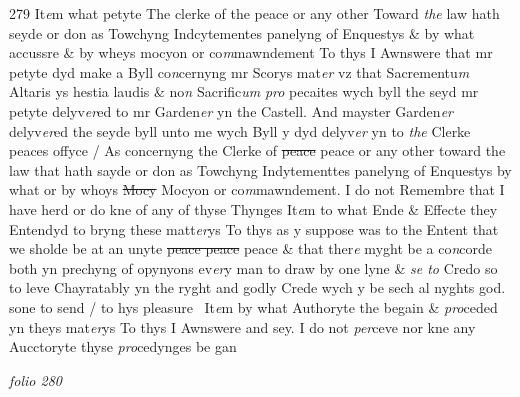 \documentclass[12pt, a4paper]{book}
\begin{document}
{\color{Mahogany}279} 
				\marginpar[\vspace{0.5cm}{\textcolor{Gray}{10}}]{}
			 It\textit{e}m what petyte The clerke of the peace or any other Toward \textit{the} law hath seyde or don as Towchyng Indcytementes panelyng of Enquestys \& by what accussre \& by wheys mocyon or co\textit{m}mawndement To thys I Awnswere that mr petyte dyd make a Byll co\textit{n}cernyng mr Scorys mat\textit{er} vz that Sacrementu\textit{m} Altaris ys hestia laudis \& no\textit{n} Sacrific\textit{um}
               \textit{pro} pecaites wych byll the seyd mr petyte delyv\textit{er}ed to mr Garden\textit{er} yn the Castell. And mayster Garden\textit{er} delyv\textit{er}ed the seyde byll unto me wych Byll y dyd delyv\textit{er} yn to \textit{the} Clerke peaces offyce / As concernyng the Clerke of \sout{peace} peace or any other toward the law that hath sayde or don as Towchyng  Indytementtes panelyng of Enquestys by what or by whoys \sout{Mocy} Mocyon or co\textit{m}mawndement. I do not Remembre that I have herd or do kne of any of thyse Thynges 
				\marginpar[\vspace{0.5cm}{\textcolor{Gray}{11}}]{}
			 It\textit{e}m to what Ende \& Effecte they Entendyd to bryng these matt\textit{er}ys To thys as y suppose was to the Entent that we sholde be at an unyte \sout{peace peace} peace \& that ther\textit{e} myght be a co\textit{n}corde both yn prechyng of opynyons ev\textit{er}y man to draw by one lyne \& \textit{se to} Credo so to leve Chayratably yn the ryght and godly Crede wych y be sech al nyghts god. sone to send / to hys pleasure   
				\marginpar[\vspace{0.5cm}{\textcolor{Gray}{12}}]{}
			 It\textit{e}m by what Authoryte the begain \& \textit{pro}ceded yn theys mat\textit{er}ys To thys I Awnswere and sey. I do not \textit{per}ceve nor kne any Aucctoryte  thyse \textit{pro}cedynges be gan

\dotfill
					

\textit{folio 280}


         \vspace{4cm}
         
\dotfill
					  \section*{}  \subsection*{}
\end{document}
